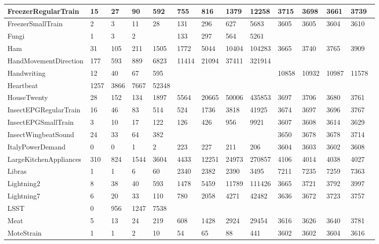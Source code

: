 \begin{landscape}
\begin{longtable}{|l|llll|llll|llll|}
      FreezerRegularTrain & 15 & 27 & 90 & 592 & 755 & 816 & 1379 & 12258 & 3715 & 3698 & 3661 & 3739 \\ \hline
      FreezerSmallTrain & 2 & 3 & 11 & 28 & 131 & 296 & 627 & 5683 & 3605 & 3605 & 3604 & 3610 \\ \hline
      Fungi & 1 & 3 & 2 &  & 133 & 297 & 564 & 5261 &  &  &  &  \\ \hline
      Ham & 31 & 105 & 211 & 1505 & 1772 & 5044 & 10404 & 104283 & 3665 & 3740 & 3765 & 3909 \\ \hline
      HandMovementDirection & 177 & 593 & 889 & 6823 & 11414 & 21094 & 37411 & 321914 &  &  &  &  \\ \hline
      Handwriting & 12 & 40 & 67 & 595 &  &  &  &  & 10858 & 10932 & 10987 & 11578 \\ \hline
      Heartbeat & 1257 & 3866 & 7667 & 52348 &  &  &  &  &  &  &  &  \\ \hline
      HouseTwenty & 28 & 152 & 134 & 1897 & 5564 & 20665 & 50006 & 435853 & 3697 & 3706 & 3680 & 3761 \\ \hline
      InsectEPGRegularTrain & 16 & 46 & 83 & 514 & 524 & 1736 & 3818 & 41925 & 3674 & 3697 & 3696 & 3767 \\ \hline
      InsectEPGSmallTrain & 3 & 10 & 17 & 122 & 126 & 426 & 956 & 9921 & 3607 & 3608 & 3614 & 3629 \\ \hline
      InsectWingbeatSound & 24 & 33 & 64 & 382 &  &  &  &  & 3650 & 3678 & 3678 & 3714 \\ \hline
      ItalyPowerDemand & 0 & 0 & 1 & 2 & 223 & 227 & 211 & 206 & 3604 & 3603 & 3602 & 3608 \\ \hline
      LargeKitchenAppliances & 310 & 824 & 1544 & 3604 & 4433 & 12251 & 24973 & 270857 & 4106 & 4014 & 4038 & 4027 \\ \hline
      Libras & 1 & 1 & 6 & 60 & 2340 & 2382 & 2390 & 3495 & 7211 & 7235 & 7259 & 7363 \\ \hline
      Lightning2 & 8 & 38 & 40 & 593 & 1478 & 5459 & 11789 & 111426 & 3665 & 3721 & 3792 & 3997 \\ \hline
      Lightning7 & 6 & 20 & 33 & 110 & 780 & 2058 & 4271 & 42482 & 3636 & 3672 & 3723 & 3757 \\ \hline
      LSST & 0 & 956 & 1247 & 7538 &  &  &  &  &  &  &  &  \\ \hline
      Meat & 5 & 13 & 24 & 219 & 608 & 1428 & 2924 & 29454 & 3616 & 3626 & 3640 & 3781 \\ \hline
      MoteStrain & 1 & 1 & 2 & 10 & 54 & 65 & 88 & 441 & 3602 & 3602 & 3604 & 3616 \\ \hline

\end{longtable}
\end{landscape}
